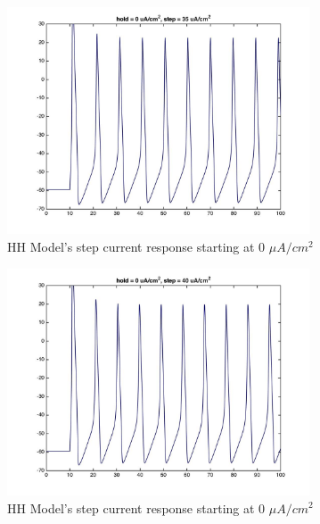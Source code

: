 \documentclass{beamer}
\begin{document}
\begin{frame}
  \begin{figure}
    \centering
    \includegraphics[width = 0.8\textwidth]{./images/current_0_35.jpg}
    \caption{HH Model's step current response starting at 0 $\mu A/cm^2$}
  \end{figure}
\end{frame}

\begin{frame}
  \begin{figure}
    \centering
    \includegraphics[width = 0.8\textwidth]{./images/current_0_40.jpg}
    \caption{HH Model's step current response starting at 0 $\mu A/cm^2$}
  \end{figure}
\end{frame}
\end{document}
